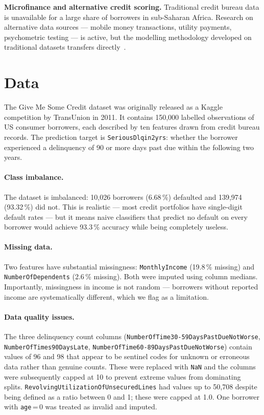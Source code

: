 \documentclass[11pt]{article}
\begin{document}
\noindent\textbf{Microfinance and alternative credit scoring.}
Traditional credit bureau data is unavailable for a large share of borrowers in
sub-Saharan Africa. Research on alternative data sources --- mobile money
transactions, utility payments, psychometric testing --- is active, but the
modelling methodology developed on traditional datasets transfers
directly~\cite{demirguc2018financial}.

\section{Data}

The Give Me Some Credit dataset was originally released as a Kaggle competition
by TransUnion in 2011. It contains 150,000 labelled observations of US consumer
borrowers, each described by ten features drawn from credit bureau records.
The prediction target is \texttt{SeriousDlqin2yrs}: whether the borrower
experienced a delinquency of 90 or more days past due within the following
two years.

\paragraph{Class imbalance.} The dataset is imbalanced: 10,026 borrowers (6.68\,\%)
defaulted and 139,974 (93.32\,\%) did not. This is realistic --- most credit
portfolios have single-digit default rates --- but it means naive classifiers
that predict no default on every borrower would achieve 93.3\,\% accuracy
while being completely useless.

\paragraph{Missing data.} Two features have substantial missingness:
\texttt{MonthlyIncome} (19.8\,\% missing) and \texttt{NumberOfDependents}
(2.6\,\% missing). Both were imputed using column medians. Importantly,
missingness in income is not random --- borrowers without reported income
are systematically different, which we flag as a limitation.

\paragraph{Data quality issues.} The three delinquency count columns
(\texttt{NumberOfTime30-59DaysPastDueNotWorse},
\texttt{NumberOfTimes90DaysLate},
\texttt{NumberOfTime60-89DaysPastDueNotWorse}) contain values of 96 and 98
that appear to be sentinel codes for unknown or erroneous data rather than
genuine counts. These were replaced with \texttt{NaN} and the columns were
subsequently capped at 10 to prevent extreme values from dominating splits.
\texttt{RevolvingUtilizationOfUnsecuredLines} had values up to 50,708 despite
being defined as a ratio between 0 and 1; these were capped at 1.0. One
borrower with \texttt{age}\,=\,0 was treated as invalid and imputed.
\end{document}
